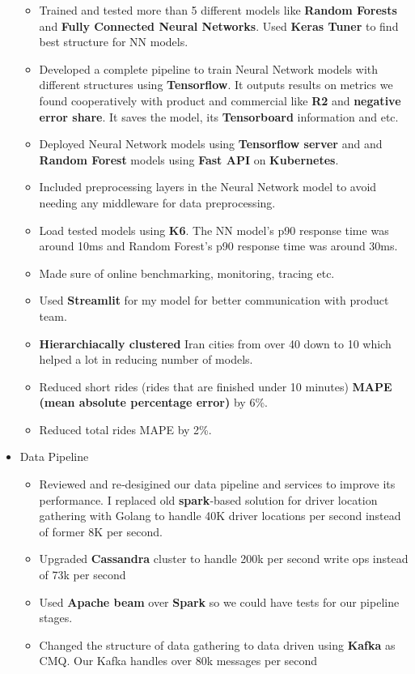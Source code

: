\begin{itemize}
\begin{itemize}
    \item Trained and tested more than 5 different models like \textbf{Random Forests} and \textbf{Fully Connected Neural Networks}. Used \textbf{Keras Tuner} to find best structure for NN models.
    \item Developed a complete pipeline to train Neural Network models with different structures using \textbf{Tensorflow}. It outputs results on metrics we found cooperatively with product and commercial like \textbf{R2} and \textbf{negative error share}. It saves the model, its \textbf{Tensorboard} information and etc.
    \item Deployed Neural Network models using \textbf{Tensorflow server} and and \textbf{Random Forest} models using \textbf{Fast API} on \textbf{Kubernetes}.
    \item Included preprocessing layers in the Neural Network model to avoid needing any middleware for data preprocessing.
    \item Load tested models using \textbf{K6}. The NN model's p90 response time was around 10ms and Random Forest's p90 response time was around 30ms.
    \item Made sure of online benchmarking, monitoring, tracing etc.
    \item Used \textbf{Streamlit} for my model for better communication with product team.
    \item \textbf{Hierarchiacally clustered} Iran cities from over 40 down to 10 which helped a lot in reducing number of models.
    \item Reduced short rides (rides that are finished under 10 minutes) \textbf{MAPE (mean absolute percentage error)} by 6\%.
    \item Reduced total rides MAPE by 2\%.
  \end{itemize}
  \item Data Pipeline
  \begin{itemize}
    \item Reviewed and re‐desigined our data pipeline and services to improve its performance. I replaced old \textbf{spark}‐based solution for driver location gathering with Golang to handle 40K driver locations per second instead of former 8K per second.
    \item Upgraded \textbf{Cassandra} cluster to handle 200k per second write ops instead of 73k per second
    \item Used \textbf{Apache beam} over \textbf{Spark} so we could have tests for our pipeline stages.
    \item Changed the structure of data gathering to data driven using \textbf{Kafka} as CMQ. Our Kafka handles over 80k messages per second

\end{itemize}
\end{itemize}
